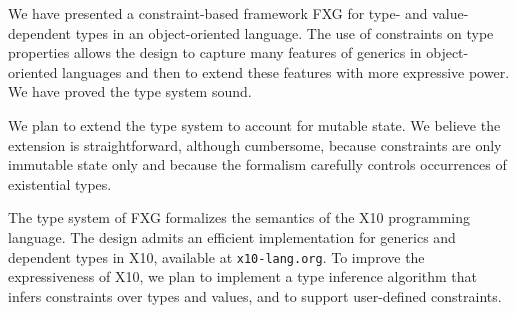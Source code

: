 \documentclass[preprint,nocopyrightspace,9pt]{sigplanconf}
\newcommand\Xten{{\sf X10}\xspace}
\def\FXG{{\sf FXG}\xspace}
\begin{document}
We have presented a constraint-based framework \FXG{} for type-
and value-dependent types in an object-oriented language.
%
The use of constraints on type properties allows the design to
capture many features of generics in object-oriented languages
and then to extend these features with more
expressive power.  We have proved the type system sound.

We plan to extend the type system to account for mutable state.
We believe the extension is straightforward, although
cumbersome, because
constraints are only immutable state only and because the formalism
carefully controls occurrences of existential types.

The type system of \FXG formalizes the semantics of the \Xten{}
programming language.  The design admits an efficient
implementation for generics and dependent types in \Xten{},
available at \texttt{x10-lang.org}.
To improve the expressiveness of \Xten{}, we plan to implement
a type inference algorithm that infers constraints over types
and values, and to support user-defined constraints.







% 
\end{document}
